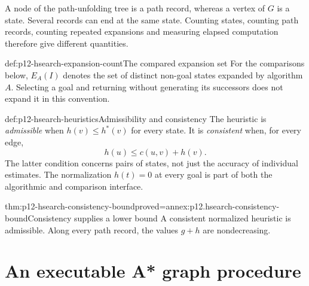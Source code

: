 A node of the path-unfolding tree is a path record, whereas a vertex of
\(G\) is a state. Several records can end at the same state. Counting
states, counting path records, counting repeated expansions and measuring
elapsed computation therefore give different quantities.
\begin{hbdefinition}{def:p12-hsearch-expansion-count}{The compared expansion set}
For the comparisons below, \(E_A(I)\) denotes the set of distinct non-goal states
expanded by algorithm \(A\). Selecting a goal and returning without
generating its successors does not expand it in this convention.
\end{hbdefinition}

\begin{hbdefinition}{def:p12-hsearch-heuristics}{Admissibility and consistency}
The heuristic is \emph{admissible} when \(h(v)\le h^*(v)\) for every
state. It is \emph{consistent} when, for every edge,
\[
 h(u)\le c(u,v)+h(v).
\]
The latter condition concerns pairs of states, not just the accuracy of
individual estimates. The normalization \(h(t)=0\) at every goal is part
of both the algorithmic and comparison interface.
\end{hbdefinition}

\begin{hbtheorem}{thm:p12-hsearch-consistency-bound}{proved=annex:p12.hsearch-consistency-bound}{Consistency supplies a lower bound}
A consistent normalized heuristic is admissible. Along every path record,
the values \(g+h\) are nondecreasing.
\end{hbtheorem}

\section{An executable A* graph procedure}

